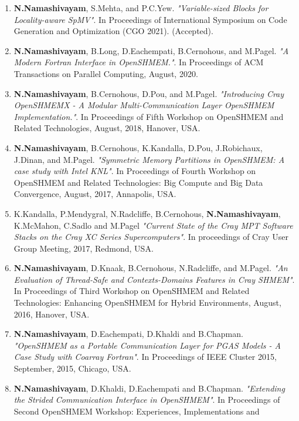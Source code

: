 \begin{enumerate}
\setcounter{enumi}{0}
\item \textbf{N.Namashivayam}, S.Mehta, and P.C.Yew. \textit{"Variable-sized 
      Blocks for Locality-aware SpMV"}. In Proceedings of International
        Symposium on Code Generation and Optimization (CGO 2021). (Accepted).
\item \textbf{N.Namashivayam}, B.Long, D.Eachempati, B.Cernohous, and M.Pagel.
      \textit{"A Modern Fortran Interface in OpenSHMEM."}. In Proceedings of
      ACM Transactions on Parallel Computing, August, 2020.
\item \textbf{N.Namashivayam}, B.Cernohous, D.Pou, and M.Pagel.
      \textit{"Introducing Cray OpenSHMEMX - A Modular Multi-Communication Layer
      OpenSHMEM Implementation."}. In Proceedings of Fifth Workshop on OpenSHMEM
      and Related Technologies, August, 2018, Hanover, USA.
\item \textbf{N.Namashivayam}, B.Cernohous, K.Kandalla, D.Pou, J.Robichaux,
      J.Dinan, and M.Pagel.
      \textit{"Symmetric Memory Partitions in OpenSHMEM: A case study with
      Intel KNL"}. In Proceedings of Fourth Workshop on OpenSHMEM and
      Related Technologies: Big Compute and Big Data Convergence, August,
      2017, Annapolis, USA.
\item K.Kandalla, P.Mendygral, N.Radcliffe, B.Cernohous,
      \textbf{N.Namashivayam}, K.McMahon, C.Sadlo and M.Pagel
      \textit{"Current State of the Cray MPT Software Stacks on the Cray XC
      Series Supercomputers"}. In proceedings of Cray User Group Meeting,
      2017, Redmond, USA.
\item \textbf{N.Namashivayam}, D.Knaak, B.Cernohous, N.Radcliffe, and
      M.Pagel.
      \textit{"An Evaluation of Thread-Safe and Contexts-Domains Features in
      Cray SHMEM"}. In Proceedings of Third Workshop on OpenSHMEM and Related
      Technologies: Enhancing OpenSHMEM for Hybrid Environments, August, 2016,
      Hanover, USA.
\item \textbf{N.Namashivayam}, D.Eachempati, D.Khaldi and B.Chapman.
      \textit{"OpenSHMEM as a Portable Communication Layer for PGAS Models - A
      Case Study with Coarray Fortran"}. In Proceedings of IEEE Cluster 2015,
      September, 2015, Chicago, USA.
\item \textbf{N.Namashivayam}, D.Khaldi, D.Eachempati and B.Chapman.
      \textit{"Extending the Strided Communication Interface in OpenSHMEM"}. In
      Proceedings of Second OpenSHMEM Workshop: Experiences, Implementations and

\end{enumerate}
